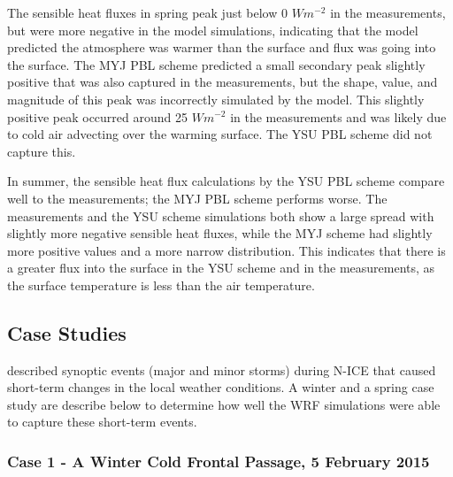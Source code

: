 The sensible heat fluxes in spring peak just below 0 $Wm^{-2}$ in the measurements, but were more negative in the model simulations, indicating that the model predicted the atmosphere was warmer than the surface and flux was going into the surface. The MYJ PBL scheme predicted a small secondary peak slightly positive that was also captured in the measurements, but the shape, value, and magnitude of this peak was incorrectly simulated by the model. This slightly positive peak occurred around 25 $Wm^{-2}$ in the measurements and was likely due to cold air advecting over the warming surface. The YSU PBL scheme did not capture this.

In summer, the sensible heat flux calculations by the YSU PBL scheme compare well to the measurements; the MYJ PBL scheme performs worse. The measurements and the YSU scheme simulations both show a large spread with slightly more negative sensible heat fluxes, while the MYJ scheme had slightly more positive values and a more narrow distribution. This indicates that there is a greater flux into the surface in the YSU scheme and in the measurements, as the surface temperature is less than the air temperature.

\subsection{Case Studies}

\cite{cohen:2015} described synoptic events (major and minor storms) during N-ICE that caused short-term changes in the local weather conditions. A winter and a spring case study are describe below to determine how well the WRF simulations were able to capture these short-term events.

\subsubsection{Case 1 - A Winter Cold Frontal Passage, 5 February 2015}

